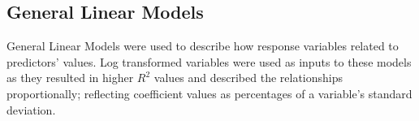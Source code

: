 \documentclass[review,12pt,authoryear]{elsarticle}
\begin{document}
\begin{linenumbers}
\subsection{General Linear Models}
General Linear Models were used to describe how response variables related to predictors' values. Log transformed variables were used as inputs to these models as they resulted in higher $R^2$ values and described the relationships proportionally; reflecting coefficient values as percentages of a variable's standard deviation.
\begin{table}[]
  \caption{Summary of models; their performance, F-statistics and Residual error.}\label{tab:modelsummary}
\end{table}
\end{linenumbers}
\end{document}
